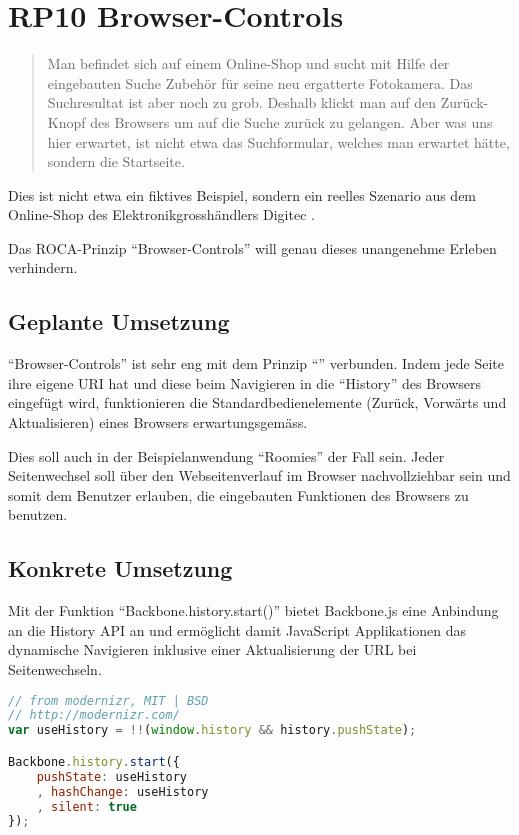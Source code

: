 \section{RP10 Browser-Controls}
\label{sec:principle-rp10-browser-controls}
\begin{quotation}
Man befindet sich auf einem Online-Shop und sucht mit Hilfe der eingebauten Suche Zubehör für seine neu ergatterte Fotokamera. Das Suchresultat ist aber noch zu grob. Deshalb klickt man auf den Zurück-Knopf des Browsers um auf die Suche zurück zu gelangen. Aber was uns hier erwartet, ist nicht etwa das Suchformular, welches man erwartet hätte, sondern die Startseite.
\end{quotation}
Dies ist nicht etwa ein fiktives Beispiel, sondern ein reelles Szenario aus dem Online-Shop des Elektronikgrosshändlers Digitec \cite{Digitec}.

Das ROCA-Prinzip ``Browser-Controls'' will genau dieses unangenehme Erleben verhindern.

\subsection*{Geplante Umsetzung}

``Browser-Controls'' ist sehr eng mit dem Prinzip ``'' verbunden. Indem jede Seite ihre eigene \gls{URI} hat und diese beim Navigieren in die ``History'' des Browsers eingefügt wird, funktionieren die Standardbedienelemente (Zurück, Vorwärts und Aktualisieren) eines Browsers erwartungsgemäss.

Dies soll auch in der Beispielanwendung ``Roomies'' der Fall sein. Jeder Seitenwechsel soll über den Webseitenverlauf im Browser nachvollziehbar sein und somit dem Benutzer erlauben, die eingebauten Funktionen des Browsers zu benutzen.

\subsection*{Konkrete Umsetzung}
Mit der Funktion ``Backbone.history.start()'' \cite{BackbonejsHistory} bietet Backbone.js eine Anbindung an die History API \cite{HistoryAPI} an und ermöglicht damit JavaScript Applikationen das dynamische Navigieren inklusive einer Aktualisierung der URL bei Seitenwechseln.

\begin{lstlisting}[language=JavaScript, caption=Activierung der History in Barefoot \cite{BarefootStartClient}, label=lst:barefootStartClientHistory, firstnumber=29]
// from modernizr, MIT | BSD
// http://modernizr.com/
var useHistory = !!(window.history && history.pushState);

Backbone.history.start({
	pushState: useHistory
	, hashChange: useHistory
	, silent: true
});
\end{lstlisting}

